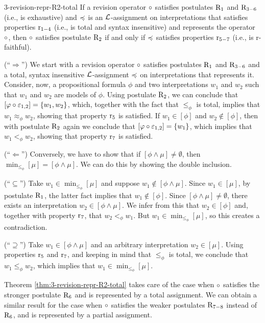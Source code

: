\begin{thm}{}{3-revision-repr-R2-total}
	If a revision operator $\circ$ satisfies postulates 
	$\mathrm{R}_{1}$ and $\mathrm{R}_{3-6}$ (i.e., is exhaustive)
	and $\preccurlyeq$ is an
	$\mathcal{L}$-assignment on interpretations that
	satisfies properties $\mathrm{r}_{1-4}$ (i.e., is total and syntax insensitive) 
	and represents the operator $\circ$,
	then 
	$\circ$ satisfies postulate $\mathrm{R}_{2}$ if and only if
	$\preccurlyeq$ satisfies properties $\mathrm{r}_{5-7}$
	(i.e., is r-faithful).
\end{thm}
\begin{prf*}{}{}%
	(``$\Rightarrow$'')
	We start with a revision operator $\circ$ satisfies postulates 
	$\mathrm{R}_{1}$ and $\mathrm{R}_{3-6}$ and a total, syntax insensitive 
	$\mathcal{L}$-assignment $\preccurlyeq$ on interpretations
	that represents it. 
	Consider, now, a propositional formula $\phi$ and 
	two interpretations $w_1$ and $w_2$ such that 
	$w_1$ and $w_2$ are models of $\phi$.
	Using postulate $\mathrm{R}_{2}$, we can conclude that $[\varphi\circ\varepsilon_{1,2}]=\{w_1,w_2\}$,
	which, together with the fact that $\le_{\phi}$ is total, 
	implies that $w_1\approx_{\phi} w_2$,
	showing that property $\mathrm{r}_{5}$ is satisfied.
	If $w_1\in[\phi]$ and $w_2\notin[\phi]$, then with postulate $\mathrm{R}_{2}$ again 
	we conclude that $[\varphi\circ\varepsilon_{1,2}]=\{w_1\}$,
	which implies that $w_1<_{\phi}w_2$, showing that property $\mathrm{r}_{7}$ is satisfied.

	(``$\Leftarrow$'')
	Conversely, we have to show that if $[\phi\land\mu]\neq\emptyset$,
	then $\min_{\le_{\phi}}[\mu]=[\phi\land\mu]$. We can do this by showing the 
	double inclusion.

	(``$\subseteq$'')
	Take $w_1\in\min_{\le_{\phi}}[\mu]$ and suppose $w_1\notin[\phi\land\mu]$.
	Since $w_1\in[\mu]$, by postulate $\mathrm{R}_{1}$,
	the latter fact implies that $w_1\notin[\phi]$.
	Since $[\phi\land\mu]\neq\emptyset$, there exists an 
	interpretation $w_2\in[\phi\land\mu]$.
	We infer from this that $w_2\in[\phi]$ and, together with property $\mathrm{r}_{7}$,
	that $w_2<_{\phi}w_1$.
	But $w_1\in\min_{\le_{\phi}}[\mu]$, so this creates a contradiction.

	(``$\supseteq$'')
	Take $w_1\in[\phi\land\mu]$ and an arbitrary interpretation $w_2\in[\mu]$.
	Using properties $\mathrm{r}_{5}$ and $\mathrm{r}_{7}$, and keeping in mind that 
	$\le_{\phi}$ is total, we conclude that $w_1 \le_{\phi}w_2$,
	which implies that $w_1\in\min_{\le_{\phi}}[\mu]$.
\end{prf*}

Theorem \ref{thm:3-revision-repr-R2-total} takes care of the case 
when $\circ$ satisfies the stronger postulate $\mathrm{R}_{6}$ and is represented 
by a total assignment.
We can obtain a similar result for the case when $\circ$ satisfies the weaker postulates 
$\mathrm{R}_{7-8}$ instead of $\mathrm{R}_{6}$, and is represented by a partial assignment.

